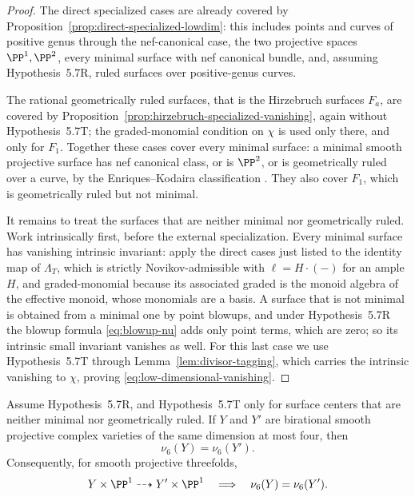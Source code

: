 \begin{proof}
The direct specialized cases are already covered by
Proposition~\ref{prop:direct-specialized-lowdim}: this includes points and
curves of positive genus through the nef-canonical case, the two projective
spaces \(\PP^1,\PP^2\), every minimal surface with nef canonical bundle,
and, assuming Hypothesis~5.7R, ruled surfaces over positive-genus curves.

The rational geometrically ruled surfaces, that is the Hirzebruch surfaces
\(F_a\), are covered by Proposition~\ref{prop:hirzebruch-specialized-vanishing},
again without Hypothesis~5.7T; the graded-monomial condition on \(\chi\) is used
only there, and only for \(F_1\).  Together these cases cover every minimal
surface: a minimal smooth projective surface has nef canonical class, or is
\(\PP^2\), or is geometrically ruled over a curve, by the Enriques--Kodaira
classification \cite[Chapter~VI]{BeauvilleSurfaces}.  They also cover \(F_1\),
which is geometrically ruled but not minimal.

It remains to treat the surfaces that are neither minimal nor geometrically
ruled.  Work intrinsically first, before the external specialization.  Every
minimal surface has vanishing intrinsic invariant: apply the direct cases just
listed to the identity map of \(\Lambda_T\), which is strictly
Novikov-admissible with \(\ell=H\cdot(-)\) for an ample \(H\), and
graded-monomial because its associated graded is the monoid algebra of the
effective monoid, whose monomials are a basis.  A surface that is not minimal
is obtained from a minimal one
by point blowups, and under Hypothesis~5.7R the blowup formula
\eqref{eq:blowup-nu} adds only point terms, which are zero; so its intrinsic
small invariant vanishes as well.  For this last case we use Hypothesis~5.7T
through Lemma~\ref{lem:divisor-tagging}, which carries the intrinsic vanishing
to \(\chi\), proving \eqref{eq:low-dimensional-vanishing}.
\end{proof}

\begin{theorem}
\label{thm:nu6-birational-invariance}
%
%
Assume Hypothesis~5.7R, and Hypothesis~5.7T only for surface centers that are
neither minimal nor geometrically ruled.
If \(Y\) and \(Y'\) are birational smooth projective complex varieties of
the same dimension at most four, then
\[
 \nu_6(Y)=\nu_6(Y').
 \label{eq:nu-birational-invariance}
\]
Consequently, for smooth projective threefolds,
\[
 Y\times\PP^1\dashrightarrow Y'\times\PP^1
 \quad\Longrightarrow\quad \nu_6(Y)=\nu_6(Y').
\]
\end{theorem}

